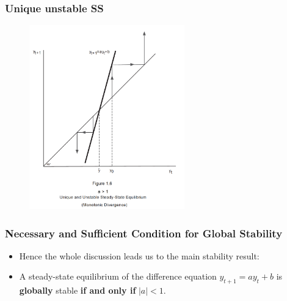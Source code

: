 \documentclass[11pt]{beamer}
\begin{document}

\begin{frame}
\frametitle{Unique unstable SS}
{\begin{figure}
\centering
\includegraphics[width = 0.6\textwidth]{./images/fig5}
\end{figure}}
\end{frame}


\begin{frame}
\frametitle{Necessary and Sufficient Condition for Global Stability}
\begin{itemize}\itemsep2ex
	\item Hence the whole discussion leads us to the main stability result:
	\item A steady-state equilibrium of the difference equation $y_{t+1} = a y_t + b$ is \textbf{globally} stable \textbf{if and only if} $|a|<1$.
\end{itemize}
\end{frame}

\end{document}
